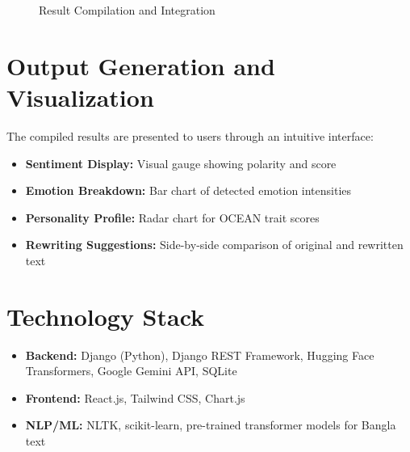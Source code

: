 \documentclass[12pt,a4paper]{report}
\begin{document}
\begin{itemize}
\begin{figure}[H]
\caption{Result Compilation and Integration}
\label{fig:result_compilation}
\end{figure}

\section{Output Generation and Visualization}

The compiled results are presented to users through an intuitive interface:

\begin{itemize}
    \item \textbf{Sentiment Display:} Visual gauge showing polarity and score
    \item \textbf{Emotion Breakdown:} Bar chart of detected emotion intensities
    \item \textbf{Personality Profile:} Radar chart for OCEAN trait scores
    \item \textbf{Rewriting Suggestions:} Side-by-side comparison of original and rewritten text
\end{itemize}

\section{Technology Stack}

\begin{itemize}
    \item \textbf{Backend:} Django (Python), Django REST Framework, Hugging Face Transformers, Google Gemini API, SQLite
    \item \textbf{Frontend:} React.js, Tailwind CSS, Chart.js
    \item \textbf{NLP/ML:} NLTK, scikit-learn, pre-trained transformer models for Bangla text
\end{itemize}


\end{itemize}
\end{document}
